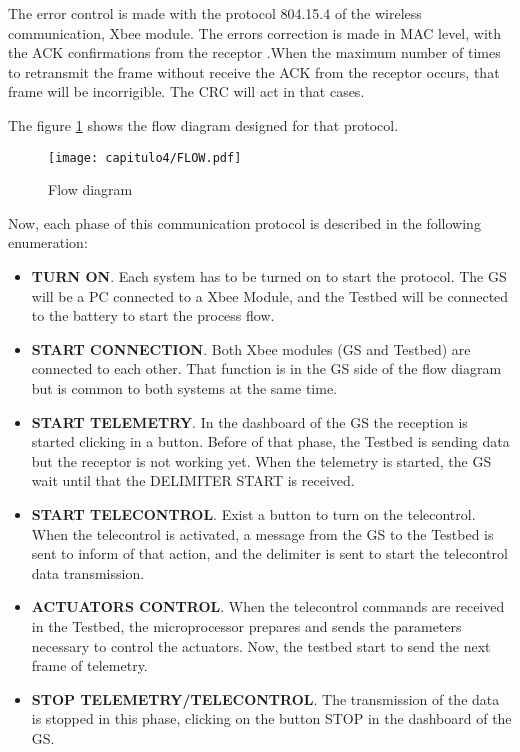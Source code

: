 The error control is made with the protocol 804.15.4 of the wireless communication, Xbee module. The errors correction is made in MAC level, with the ACK confirmations from the receptor \cite{ieeeprotocol}.When the maximum number of times to retransmit the frame without receive the ACK from the receptor occurs, that frame will be incorrigible. The CRC will act in that cases.

The figure \ref{fig:flowdiagram} shows the flow diagram designed for that protocol.

% 
\begin{figure}[H]
	\centering
		\texttt{[image: capitulo4/FLOW.pdf]}
	\caption{Flow diagram}
	\label{fig:flowdiagram}
\end{figure}

 Now, each phase of this communication protocol is described in the following enumeration:

\begin{itemize}
\item \textbf{TURN ON}. Each system has to be turned on to start the protocol. The \acrshort{GS} will be a \acrshort{PC}
 connected to a Xbee Module, and the Testbed will be connected to the battery to start the process flow.
\item \textbf{START CONNECTION}. Both Xbee modules (\acrshort{GS} and Testbed) are connected to each other. That function is in the \acrshort{GS} side of the flow diagram but is common to both systems at the same time.
\item \textbf{START TELEMETRY}. In the dashboard of the \acrshort{GS} the reception is started clicking in a button. Before of that phase, the Testbed is sending data but the receptor is not working yet. When the telemetry is started, the \acrshort{GS} wait until that the DELIMITER START is received.
\item \textbf{START TELECONTROL}. Exist a button to turn on the telecontrol. When the telecontrol is activated, a message from the \acrshort{GS} to the Testbed is sent to inform of that action, and the delimiter is sent to start the telecontrol data transmission.
\item \textbf{ACTUATORS CONTROL}. When the telecontrol commands are received in the Testbed, the microprocessor prepares and sends the parameters necessary to control the actuators. Now, the testbed start to send the next frame of telemetry.
\item \textbf{STOP TELEMETRY/TELECONTROL}. The transmission of the data is stopped in this phase, clicking on the button STOP in the dashboard of the \acrshort{GS}.
\end{itemize}


